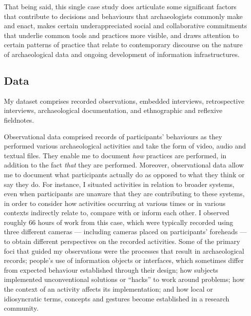 \documentclass[
]{article}
\begin{document}
That being said, this single case study does articulate some significant
factors that contribute to decisions and behaviours that archaeologists
commonly make and enact, makes certain underappreciated social and
collaborative commitments that underlie common tools and practices more
visible, and draws attention to certain patterns of practice that relate
to contemporary discourse on the nature of archaeological data and
ongoing development of information infrastructures.

\subsection{Data}\label{data}

My dataset comprises recorded observations, embedded interviews,
retrospective interviews, archaeological documentation, and ethnographic
and reflexive fieldnotes.

Observational data comprised records of participants' behaviours as they
performed various archaeological activities and take the form of video,
audio and textual files. They enable me to document \emph{how} practices
are performed, in addition to the fact \emph{that} they are performed.
Moreover, observational data allow me to document what participants
actually do as opposed to what they think or say they do. For instance,
I situated activities in relation to broader systems, even when
participants are unaware that they are contributing to these systems, in
order to consider how activities occurring at various times or in
various contexts indirectly relate to, compare with or inform each
other. I observed roughly 66 hours of work from this case, which were
typically recorded using three different cameras --- including cameras
placed on participants' foreheads --- to obtain different perspectives
on the recorded activities. Some of the primary foci that guided my
observations were the processes that result in archaeological records;
people's use of information objects or interfaces, which sometimes
differ from expected behaviour established through their design; how
subjects implemented unconventional solutions or ``hacks'' to work
around problems; how the context of an activity affects its
implementation; and how local or idiosyncratic terms, concepts and
gestures become established in a research community.
\end{document}
